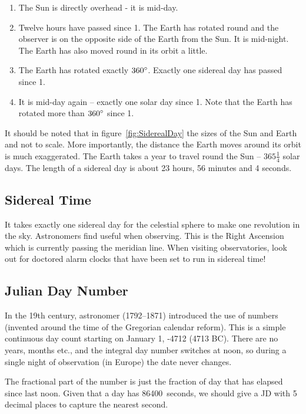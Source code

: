 \begin{enumerate}
\item
  The Sun is directly overhead - it is mid-day.
\item
  Twelve hours have passed since 1. The Earth has rotated round and the
  observer is on the opposite side of the Earth from the Sun. It is
  mid-night. The Earth has also moved round in its orbit a little.
\item
  The Earth has rotated exactly $360\degree$. Exactly one sidereal day has
  passed since 1.
\item
  It is mid-day again -- exactly one solar day since 1. Note that the
  Earth has rotated more than $360\degree$ since 1.
\end{enumerate}

It should be noted that in figure~\ref{fig:SiderealDay} the sizes of
the Sun and Earth and not to scale. More importantly, the distance the
Earth moves around its orbit is much exaggerated. The Earth takes a
year to travel round the Sun --
$365\frac{1}{4}$ solar days. The length of a
sidereal day is about 23 hours, 56 minutes and 4 seconds.

\subsection{Sidereal Time}
\label{sec:Concepts:SiderealTime}

It takes exactly one sidereal day for the celestial sphere to make one
revolution in the sky. Astronomers find 
useful when observing. This is the Right Ascension which is currently
passing the meridian line.  When visiting observatories, look out for
doctored alarm clocks that have been set to run in sidereal time!

\subsection{Julian Day Number}
\label{sec:Concepts:JulianDay}

In the 19th century, astronomer  (1792--1871) introduced the use of
 numbers (invented around the time of the Gregorian calendar
reform). This is a simple continuous day count starting on January 1, -4712
(4713 BC). There are no years, months etc., and the integral day
number switches at noon, so during a single night of observation (in
Europe) the date never changes. 

The fractional part of the number is just the fraction of day that has
elapsed since last noon. Given that a day has 86400~seconds, we should
give a JD with 5 decimal places to capture the nearest second.

